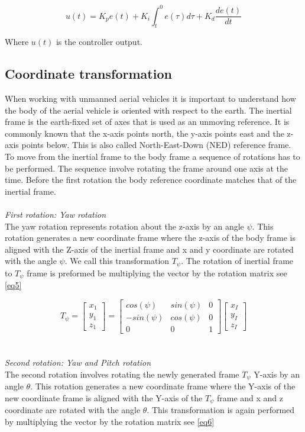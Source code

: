 \documentclass[conference]{IEEEtran}
\begin{document}
\begin{equation}
u(t) = K_p e(t)+ K_i \int_{t}^{0}  e(\tau) d\tau+K_d \frac{de(t)}{dt} \label{eq4}
\end{equation}

Where $u(t)$ is the controller output. 

\subsection{Coordinate transformation}
When working with unmanned aerial vehicles it is important to understand how the body of the aerial vehicle is oriented with respect to the earth.
The inertial frame is the earth-fixed set of axes that is used as an unmoving reference.  It is commonly known that the x-axis points north, the y-axis points east and the z-axis points below. This is also called North-East-Down (NED) reference frame. 
To move from the inertial frame to the body frame a sequence of rotations has to be performed. The sequence involve rotating the frame around one axis at the time. Before the first rotation the body reference coordinate matches that of the inertial frame. \\\\
\textit{First rotation: Yaw rotation}\\
The yaw rotation represents rotation about the z-axis by an angle $\psi$. This rotation generates a new coordinate frame where the z-axis of the body frame is aligned with the Z-axis of the inertial frame and x and y coordinate are rotated with the angle $\psi$. We call this transformation $T_\psi$. The rotation of inertial frame to $T_\psi$ frame is preformed be multiplying the vector by the rotation matrix see \cref{eq5} 

\begin{equation}
T_\psi=
\begin{bmatrix}
x_1\\
y_1\\
z_1 
\end{bmatrix}=
\begin{bmatrix}
cos(\psi) & sin(\psi) & 0\\
-sin(\psi) & cos(\psi) & 0 \\
0 & 0 & 1
\end{bmatrix}
\begin{bmatrix}
x_I\\
y_I\\
z_I 
\end{bmatrix}\label{eq5}
\end{equation}
\\\\
\textit{Second rotation: Yaw and Pitch rotation}\\
The second rotation involves rotating the newly generated frame $T_\psi$ Y-axis by an angle $\theta$. This rotation generates a new coordinate frame where the Y-axis of the new coordinate frame is aligned with the Y-axis of the $T_\psi$ frame and x and z coordinate are rotated with the angle $\theta$. This transformation is again performed by multiplying the vector by the rotation matrix see \cref{eq6}
\end{document}
